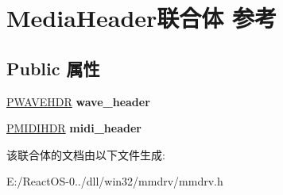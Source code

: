 \hypertarget{union_media_header}{}\section{Media\+Header联合体 参考}
\label{union_media_header}
\subsection*{Public 属性}
\begin{DoxyCompactItemize}
\item 
\mbox{\label{union_media_header_a1483c2569fc24ee7037e8e4f3515c07d}} 
\hyperlink{structwavehdr__tag}{P\+W\+A\+V\+E\+H\+DR} {\bfseries wave\+\_\+header}
\item 
\mbox{\label{union_media_header_a6fd3d9f14bd98ea71ab16bd78aaf392e}} 
\hyperlink{structmidihdr__tag}{P\+M\+I\+D\+I\+H\+DR} {\bfseries midi\+\_\+header}
\end{DoxyCompactItemize}


该联合体的文档由以下文件生成\+:\begin{DoxyCompactItemize}
\item 
E\+:/\+React\+O\+S-\/0../dll/win32/mmdrv/mmdrv.\+h\end{DoxyCompactItemize}
